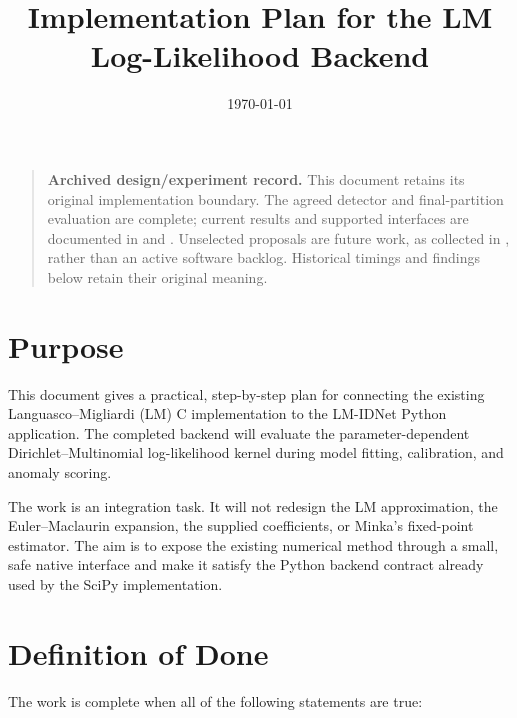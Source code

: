 \documentclass[11pt,a4paper]{article}
\title{Implementation Plan for the LM Log-Likelihood Backend}
\date{\today}
\begin{document}
\maketitle

\begin{quote}
\textbf{Archived design/experiment record.} This document retains its original
implementation boundary. The agreed detector and final-partition evaluation
are complete; current results and supported interfaces are documented in
 and
. Unselected proposals are future
work, as collected in , rather than an active software
backlog. Historical timings and findings below retain their original meaning.
\end{quote}


\section{Purpose}

This document gives a practical, step-by-step plan for connecting the existing
Languasco--Migliardi (LM) C implementation to the LM-IDNet Python application.
The completed backend will evaluate the parameter-dependent
Dirichlet--Multinomial log-likelihood kernel during model fitting, calibration,
and anomaly scoring.

The work is an integration task. It will not redesign the LM approximation,
the Euler--Maclaurin expansion, the supplied coefficients, or Minka's
fixed-point estimator. The aim is to expose the existing numerical method
through a small, safe native interface and make it satisfy the Python backend
contract already used by the SciPy implementation.

\section{Definition of Done}

The work is complete when all of the following statements are true:
\end{document}
